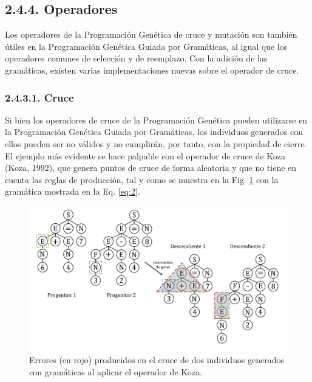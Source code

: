 \documentclass[spanish,a4paper,12pt,twoside]{report}
\begin{document}
    \subsection*{\large 2.4.4. Operadores}
    Los operadores de la Programación Genética de cruce y mutación son también útiles en la Programación Genética Guiada por Gramáticas, al igual que los operadores comunes de selección y de reemplazo. Con la adición de las gramáticas, existen varias implementaciones nuevas sobre el operador de cruce.
    
      \vspace{-0.5cm}
      \subsubsection*{\normalsize 2.4.3.1. Cruce}
      Si bien los operadores de cruce de la Programación Genética pueden utilizarse en la Programación Genética Guiada por Gramáticas, los individuos generados con ellos pueden ser no válidos y no cumplirán, por tanto, con la propiedad de cierre. El ejemplo más evidente se hace palpable con el operador de cruce de Koza (Koza, 1992), que genera puntos de cruce de forma aleatoria y que no tiene en cuenta las reglas de producción, tal y como se muestra en la Fig. \ref{fig:7} con la gramática mostrada en la Eq. \ref{eq:2}. \par
      \begin{figure}[H]
        \centering
        \includegraphics[width = 1\textwidth]{resources/Fig7.pdf}
        \caption{Errores (en rojo) producidos en el cruce de dos individuos generados con gramáticas al aplicar el operador de Koza.}
        \label{fig:7}
      \end{figure} 
\end{document}
